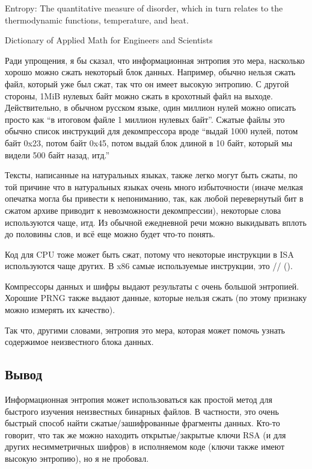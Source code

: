 \label{entropy}

\epigraph{Entropy: The quantitative measure of disorder, which in turn relates to the thermodynamic functions, temperature, and heat.}
{Dictionary of Applied Math for Engineers and Scientists}

Ради упрощения, я бы сказал, что информационная энтропия это мера, насколько хорошо можно сжать
некоторый блок данных.
Например, обычно нельзя сжать файл, который уже был сжат, так что он имеет высокую энтропию.
С другой стороны, 1MiB нулевых байт можно сжать в крохотный файл на выходе.
Действительно, в обычном русском языке, один миллион нулей можно описать просто как
``в итоговом файле 1 миллион нулевых байт''.
Сжатые файлы это обычно список инструкций для декомпрессора вроде
``выдай 1000 нулей, потом байт 0x23, потом байт 0x45, потом выдай блок длиной в 10 байт, который мы видели 500 байт назад,
итд.''

Тексты, написанные на натуральных языках, также легко могут быть сжаты, по той причине что в натуральных языках очень
много избыточности (иначе мелкая опечатка могла бы привести к непониманию, так, как любой перевернутый бит в сжатом
архиве приводит к невозможности декомпрессии),
некоторые слова используются чаще, итд.
Из обычной ежедневной речи можно выкидывать вплоть до половины слов, и всё еще можно будет что-то понять.

Код для CPU тоже может быть сжат, потому что некоторые инструкции в \ac{ISA} используются чаще других.
В x86 самые используемые инструкции, это // ().

Компрессоры данных и шифры выдают результаты с очень большой энтропией.
Хорошие \ac{PRNG} также выдают данные, которые нельзя сжать
(по этому признаку можно измерять их качество).

Так что, другими словами, энтропия это мера, которая может помочь узнать содержимое неизвестного блока данных.



\subsection{Вывод}

Информационная энтропия может использоваться как простой метод для быстрого изучения неизвестных бинарных файлов.
В частности, это очень быстрый способ найти сжатые/зашифрованные фрагменты данных.
Кто-то говорит, что так же можно находить открытые/закрытые ключи \ac{RSA} (и для других несимметричных шифров)
в исполняемом коде (ключи также имеют  высокую энтропию), но я не пробовал.

